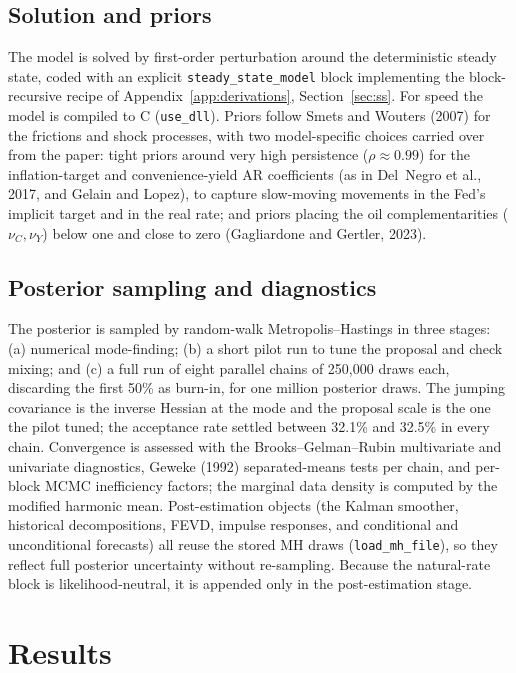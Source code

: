 \documentclass[11pt]{article}
\theoremstyle{definition}
\begin{document}
\subsection{Solution and priors}
The model is solved by first-order perturbation around the deterministic steady state, coded with an
explicit \texttt{steady\_state\_model} block implementing the block-recursive recipe of
Appendix~\ref{app:derivations}, Section~\ref{sec:ss}. For speed the model is compiled to C
(\texttt{use\_dll}). Priors follow Smets and Wouters (2007) for the frictions and shock processes, with
two model-specific choices carried over from the paper: tight priors around very high persistence
($\rho\approx 0.99$) for the inflation-target and convenience-yield AR coefficients (as in Del~Negro
et al., 2017, and Gelain and Lopez), to capture slow-moving movements in the Fed's implicit target and
in the real rate; and priors placing the oil complementarities ($\nu_C,\nu_Y$) below one and close to
zero (Gagliardone and Gertler, 2023).

\subsection{Posterior sampling and diagnostics}
The posterior is sampled by random-walk Metropolis--Hastings in three stages: (a) numerical
mode-finding; (b) a short pilot run to tune the proposal and check mixing; and (c) a full run of eight
parallel chains of 250{,}000 draws each, discarding the first 50\% as burn-in, for one million posterior
draws. The jumping covariance is the inverse Hessian at the mode and the proposal scale is the one the
pilot tuned; the acceptance rate settled between 32.1\% and 32.5\% in every chain.
Convergence is assessed with the Brooks--Gelman--Rubin multivariate and univariate diagnostics, Geweke
(1992) separated-means tests per chain, and per-block MCMC inefficiency factors; the marginal data
density is computed by the modified harmonic mean. Post-estimation objects (the Kalman smoother,
historical decompositions, FEVD, impulse responses, and conditional and unconditional forecasts) all
reuse the stored MH draws (\texttt{load\_mh\_file}), so they reflect full posterior uncertainty without
re-sampling. Because the natural-rate block is likelihood-neutral, it is appended only in the
post-estimation stage.

\section{Results}\label{sec:results}
\end{document}

